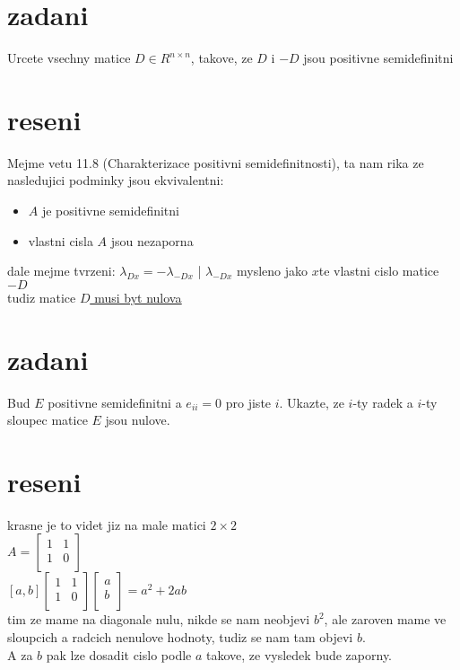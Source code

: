 \documentclass[a4paper]{article}
\def\doubleunderline#1{\underline{\underline{#1}}}
\begin{document}
\section*{zadani}
Urcete vsechny matice $D \in R^{n\times	n}$,
takove, ze $D$ i $-D$ jsou positivne semidefinitni

\section*{reseni}
Mejme vetu 11.8 (Charakterizace positivni semidefinitnosti),
ta nam rika ze nasledujici podminky jsou ekvivalentni:\\
\begin{itemize}
	\item $A$ je positivne semidefinitni
	\item vlastni cisla $A$ jsou nezaporna
\end{itemize}
dale mejme tvrzeni: $\lambda_{Dx} = -\lambda_{-Dx}$ | $\lambda_{-Dx}$ mysleno jako $x$te vlastni cislo matice $-D$\\
tudiz matice \doubleunderline{$D$ musi byt nulova}






















\section*{zadani}
Bud $E$ positivne semidefinitni a $e_{ii} = 0$ pro jiste $i$.
Ukazte, ze $i$-ty radek a $i$-ty sloupec matice $E$ jsou nulove.

\section*{reseni}
krasne je to videt jiz na male matici $2\times2$\\
$A=
\begin{bmatrix}
	1 & 1 \\
	1 & 0 \\
\end{bmatrix}
$\\
$[a,b] 
\begin{bmatrix}
	1 & 1 \\
	1 & 0 \\
\end{bmatrix}
\begin{bmatrix}
	a \\
	b \\
\end{bmatrix}
=
a^2+2ab
$\\
tim ze mame na diagonale nulu, nikde se nam neobjevi $b^2$,
ale zaroven mame ve sloupcich a radcich nenulove hodnoty,
tudiz se nam tam objevi $b$.\\
A za $b$ pak lze dosadit cislo podle $a$ takove,
ze vysledek bude zaporny. 
\end{document}
